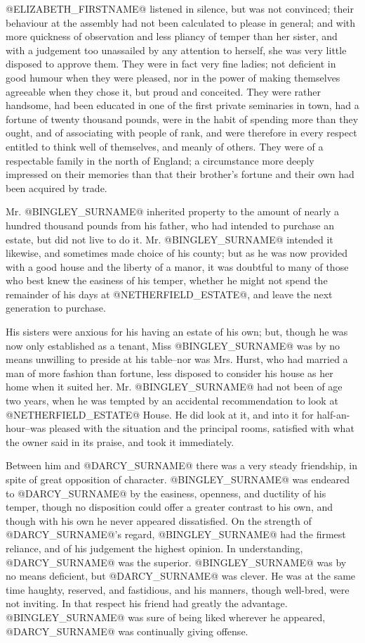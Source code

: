 @ELIZABETH_FIRSTNAME@ listened in silence, but was not convinced; their behaviour at
the assembly had not been calculated to please in general; and with more
quickness of observation and less pliancy of temper than her sister,
and with a judgement too unassailed by any attention to herself, she
was very little disposed to approve them. They were in fact very fine
ladies; not deficient in good humour when they were pleased, nor in the
power of making themselves agreeable when they chose it, but proud and
conceited. They were rather handsome, had been educated in one of the
first private seminaries in town, had a fortune of twenty thousand
pounds, were in the habit of spending more than they ought, and of
associating with people of rank, and were therefore in every respect
entitled to think well of themselves, and meanly of others. They were of
a respectable family in the north of England; a circumstance more deeply
impressed on their memories than that their brother's fortune and their
own had been acquired by trade.

Mr. @BINGLEY_SURNAME@ inherited property to the amount of nearly a hundred
thousand pounds from his father, who had intended to purchase an
estate, but did not live to do it. Mr. @BINGLEY_SURNAME@ intended it likewise, and
sometimes made choice of his county; but as he was now provided with a
good house and the liberty of a manor, it was doubtful to many of those
who best knew the easiness of his temper, whether he might not spend the
remainder of his days at @NETHERFIELD_ESTATE@, and leave the next generation to
purchase.

His sisters were anxious for his having an estate of his own; but,
though he was now only established as a tenant, Miss @BINGLEY_SURNAME@ was by no
means unwilling to preside at his table--nor was Mrs. Hurst, who had
married a man of more fashion than fortune, less disposed to consider
his house as her home when it suited her. Mr. @BINGLEY_SURNAME@ had not been of
age two years, when he was tempted by an accidental recommendation
to look at @NETHERFIELD_ESTATE@ House. He did look at it, and into it for
half-an-hour--was pleased with the situation and the principal
rooms, satisfied with what the owner said in its praise, and took it
immediately.

Between him and @DARCY_SURNAME@ there was a very steady friendship, in spite of
great opposition of character. @BINGLEY_SURNAME@ was endeared to @DARCY_SURNAME@ by the
easiness, openness, and ductility of his temper, though no disposition
could offer a greater contrast to his own, and though with his own he
never appeared dissatisfied. On the strength of @DARCY_SURNAME@'s regard, @BINGLEY_SURNAME@
had the firmest reliance, and of his judgement the highest opinion.
In understanding, @DARCY_SURNAME@ was the superior. @BINGLEY_SURNAME@ was by no means
deficient, but @DARCY_SURNAME@ was clever. He was at the same time haughty,
reserved, and fastidious, and his manners, though well-bred, were not
inviting. In that respect his friend had greatly the advantage. @BINGLEY_SURNAME@
was sure of being liked wherever he appeared, @DARCY_SURNAME@ was continually
giving offense.

